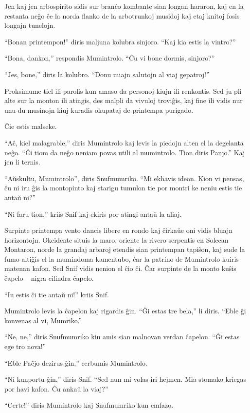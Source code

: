 Jen kaj jen arbospirito sidis sur branĉo kombante sian longan hararon, kaj en la restanta neĝo ĉe la norda flanko de la arbotrunkoj musidoj kaj etaj knitoj fosis longajn tunelojn.

``Bonan printempon!'' diris maljuna kolubra sinjoro. ``Kaj kia estis la vintro?''

``Bona, dankon,'' respondis Mumintrolo. ``Ĉu vi bone dormis, sinjoro?''

``Jes, bone,'' diris la kolubro. ``Donu miajn salutojn al viaj gepatroj!''

Proksimume tiel ili parolis kun amaso da personoj kiujn ili renkontis. Sed ju pli alte sur la monton ili atingis, des malpli da vivuloj troviĝis, kaj fine ili vidis nur unu-du musinojn kiuj kuradis okupataj de printempa purigado.

Ĉie estis malseke.

``Aĉ, kiel malagrable,'' diris Mumintrolo kaj levis la piedojn alten el la degelanta neĝo. ``Ĉi tiom da neĝo neniam povas utili al mumintrolo. Tion diris Panjo.'' Kaj jen li ternis.

``Aŭskultu, Mumintrolo'', diris Snufmumriko. ``Mi ekhavis ideon. Kion vi pensas, ĉu ni iru ĝis la montopinto kaj starigu tumulon tie por montri ke neniu estis tie antaŭ ni?''

``Ni faru tion,'' kriis Snif kaj ekiris por atingi antaŭ la aliaj.

Surpinte printempa vento dancis libere en rondo kaj ĉirkaŭe oni vidis bluajn horizontojn. Okcidente situis la maro, oriente la rivero serpentis en Solecan Montaron, norde la grandaj arbaroj etendis sian printempan tapiŝon, kaj sude la fumo altiĝis el la mumindoma kamentubo, ĉar la patrino de Mumintrolo kuiris matenan kafon. Sed Snif vidis nenion el ĉio ĉi. Ĉar surpinte de la monto kuŝis ĉapelo -- nigra cilindra ĉapelo.

``Iu estis ĉi tie antaŭ ni!'' kriis Snif.

Mumintrolo levis la ĉapelon kaj rigardis ĝin. ``Ĝi estas tre bela,'' li diris. ``Eble ĝi konvenas al vi, Mumriko.''

``Ne, ne,'' diris Snufmumriko kiu amis sian malnovan verdan ĉapelon. ``Ĝi estas ege tro nova!''

``Eble Paĉjo dezirus ĝin,'' cerbumis Mumintrolo.

``Ni kunportu ĝin,'' diris Snif. ``Sed nun mi volas iri hejmen. Mia stomako kriegas por havi kafon. Ĉu ankaŭ la viaj?''

``Certe!'' diris Mumintrolo kaj Snufmumriko kun emfazo.

